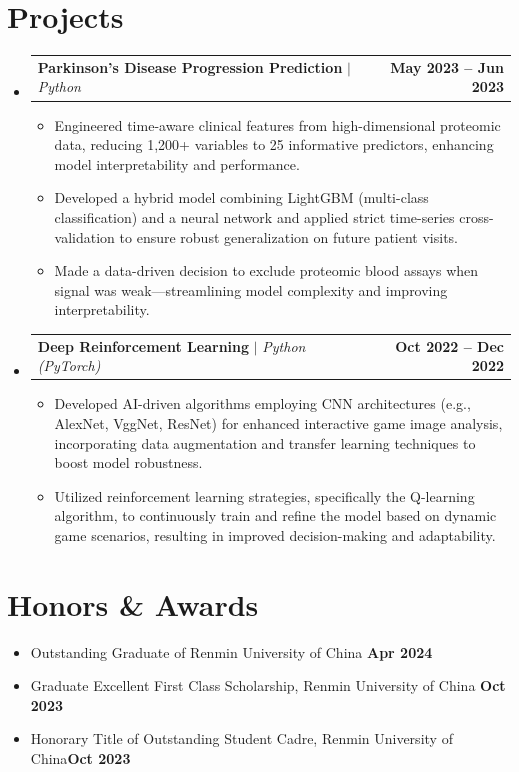 \documentclass[letterpaper,11pt]{article}
\makeatletter
\newcommand{\resumeItem}[1]{
  \item\small{
    {#1 \vspace{-2pt}}
  }
}
\newcommand{\resumeProjectHeading}[2]{\vspace{-2pt}
    \item
    \begin{tabular*}{1.0\textwidth}{l@{\extracolsep{\fill}}r}
      \small#1 & \textbf{\small #2}\\
    \end{tabular*}\vspace{-7pt}
}
\newcommand{\resumeSubHeadingListStart}{\begin{itemize}[leftmargin=0.0in, label={}]}
\newcommand{\resumeSubHeadingListEnd}{\end{itemize}}
\newcommand{\resumeItemListStart}{\begin{itemize}}
\newcommand{\resumeItemListEnd}{\end{itemize}\vspace{-5pt}}
\makeatother
\begin{document}
\section{Projects}
    \resumeSubHeadingListStart
      \resumeProjectHeading
      {\textbf{Parkinson's Disease Progression Prediction} $|$ \emph{Python}}{May 2023 -- Jun 2023}
      \resumeItemListStart
        \resumeItem{Engineered time-aware clinical features from high-dimensional proteomic data, reducing 1,200+ variables to 25 informative predictors, enhancing model interpretability and performance.}
        \resumeItem{Developed a hybrid model combining LightGBM (multi-class classification) and a neural network and applied strict time-series cross-validation to ensure robust generalization on future patient visits.}
        \resumeItem{Made a data-driven decision to exclude proteomic blood assays when signal was weak—streamlining model complexity and improving interpretability.}
      \resumeItemListEnd
      \resumeProjectHeading
          {\textbf{Deep Reinforcement Learning} $|$ \emph{Python (PyTorch)}}{Oct 2022 -- Dec 2022}
          \resumeItemListStart
            \resumeItem{Developed AI-driven algorithms employing CNN architectures (e.g., AlexNet, VggNet, ResNet) for enhanced interactive game image analysis, incorporating data augmentation and transfer learning techniques to boost model robustness.}
            \resumeItem{Utilized reinforcement learning strategies, specifically the Q-learning algorithm, to continuously train and refine the model based on dynamic game scenarios, resulting in improved decision-making and adaptability.}
          \resumeItemListEnd 
    \resumeSubHeadingListEnd
\vspace{-15pt}


\section{Honors \& Awards}
\begin{itemize}[leftmargin=0.15in, itemsep=-2pt]
    \small 
    \item Outstanding Graduate of Renmin University of China \hfill \textbf{Apr 2024} \\
    \item Graduate Excellent First Class Scholarship, Renmin University of China \hfill \textbf{Oct 2023} \\
     \item Honorary Title of Outstanding Student Cadre, Renmin University of China\hfill \textbf{Oct 2023} \\
    
 \end{itemize}
 \vspace{-15pt}
\end{document}
